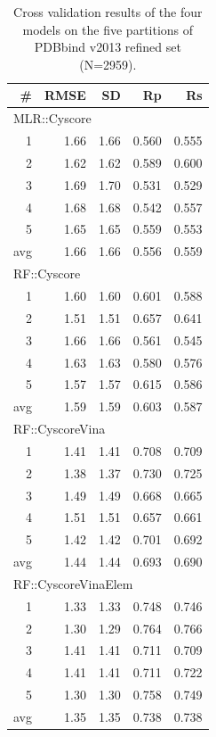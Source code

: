 \documentclass[journal=jacsat,manuscript=article]{achemso}
\begin{document}
\begin{table}
\caption{Cross validation results of the four models on the five partitions of PDBbind v2013 refined set (N=2959).}
\label{tbl:cv}
\begin{tabular}{rrrrr}
\hline
\# & RMSE & SD & Rp & Rs\\
\hline
\multicolumn{5}{l}{MLR::Cyscore}\\
  1 & 1.66 & 1.66 & 0.560 & 0.555\\
  2 & 1.62 & 1.62 & 0.589 & 0.600\\
  3 & 1.69 & 1.70 & 0.531 & 0.529\\
  4 & 1.68 & 1.68 & 0.542 & 0.557\\
  5 & 1.65 & 1.65 & 0.559 & 0.553\\
avg & 1.66 & 1.66 & 0.556 & 0.559\\
\hline
\multicolumn{5}{l}{RF::Cyscore}\\
  1 & 1.60 & 1.60 & 0.601 & 0.588\\
  2 & 1.51 & 1.51 & 0.657 & 0.641\\
  3 & 1.66 & 1.66 & 0.561 & 0.545\\
  4 & 1.63 & 1.63 & 0.580 & 0.576\\
  5 & 1.57 & 1.57 & 0.615 & 0.586\\
avg & 1.59 & 1.59 & 0.603 & 0.587\\
\hline
\multicolumn{5}{l}{RF::CyscoreVina}\\
  1 & 1.41 & 1.41 & 0.708 & 0.709\\
  2 & 1.38 & 1.37 & 0.730 & 0.725\\
  3 & 1.49 & 1.49 & 0.668 & 0.665\\
  4 & 1.51 & 1.51 & 0.657 & 0.661\\
  5 & 1.42 & 1.42 & 0.701 & 0.692\\
avg & 1.44 & 1.44 & 0.693 & 0.690\\
\hline
\multicolumn{5}{l}{RF::CyscoreVinaElem}\\
  1 & 1.33 & 1.33 & 0.748 & 0.746\\
  2 & 1.30 & 1.29 & 0.764 & 0.766\\
  3 & 1.41 & 1.41 & 0.711 & 0.709\\
  4 & 1.41 & 1.41 & 0.711 & 0.722\\
  5 & 1.30 & 1.30 & 0.758 & 0.749\\
avg & 1.35 & 1.35 & 0.738 & 0.738\\
\hline
\end{tabular}
\end{table}
\end{document}
